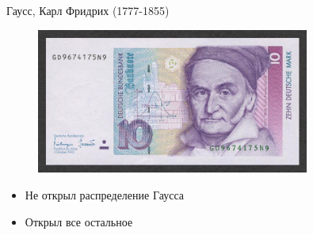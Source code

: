 \documentclass[aspectratio=169]{beamer}
\begin{document}
\begin{frame}{Гаусс, Карл Фридрих (1777-1855)}

\begin{figure}
	\centering  
	\includegraphics[width=0.8\textwidth]{images/gauss.jpg}
\end{figure}

\begin{itemize}
\item Не открыл распределение Гаусса
\item Открыл все остальное
\end{itemize}

\end{frame}
\end{document}
